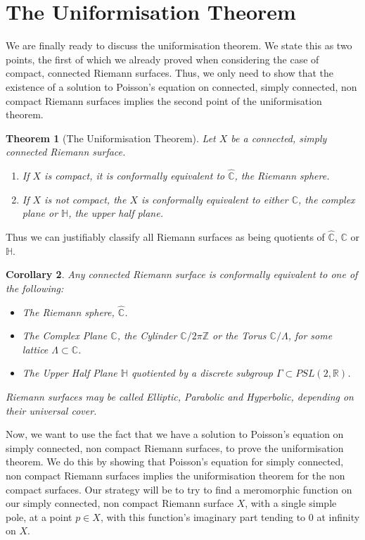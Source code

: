 \documentclass[11pt]{report}
\newtheorem{thm}{Theorem}[section]
\newtheorem{cor}[thm]{Corollary}
\theoremstyle{definition}
\begin{document}
\section{The Uniformisation Theorem}
We are finally ready to discuss the uniformisation theorem. We state this as two points, the first of which we already proved when considering the case of compact, connected Riemann surfaces. Thus, we only need to show that the existence of a solution to Poisson's equation on connected, simply connected, non compact Riemann surfaces implies the second point of the uniformisation theorem.
\begin{thm}[The Uniformisation Theorem]\label{Uniformisation}
  Let $X$ be a connected, simply connected Riemann surface. 
  \begin{enumerate}
    \item If $X$ is compact, it is conformally equivalent to $\widehat{\mathbb{C}}$, the Riemann sphere. 
    \item If $X$ is not compact, the $X$ is conformally equivalent to either $\mathbb{C}$, the complex plane or $\mathbb{H}$, the upper half plane.
  \end{enumerate}
\end{thm}
Thus we can justifiably classify all Riemann surfaces as being quotients of $\widehat{\mathbb{C}}$, $\mathbb{C}$ or $\mathbb{H}$.
\begin{cor}\label{importantcorollary}
  Any connected Riemann surface is conformally equivalent to one of the following:
  \begin{itemize}
    \item The Riemann sphere, $\widehat{\mathbb{C}}$.
    \item The Complex Plane $\mathbb{C}$, the Cylinder $\mathbb{C}/2\pi \mathbb{Z}$ or the Torus $\mathbb{C}/\Lambda$, for some lattice $\Lambda \subset \mathbb{C}$.
    \item The Upper Half Plane $\mathbb{H}$ quotiented by a discrete subgroup $\Gamma \subset PSL(2,\mathbb{R})$.
  \end{itemize}
  Riemann surfaces may be called Elliptic, Parabolic and Hyperbolic, depending on their universal cover.
\end{cor}
Now, we want to use the fact that we have a solution to Poisson's equation on simply connected, non compact Riemann surfaces, to prove the uniformisation theorem. We do this by showing that Poisson's equation for simply connected, non compact Riemann surfaces implies the uniformisation theorem for the non compact surfaces.
Our strategy will be to try to find a meromorphic function on our simply connected, non compact Riemann surface $X$, with a single simple pole, at a point $p \in X$, with this function's imaginary part tending to $0$ at infinity on $X$.
\end{document}
